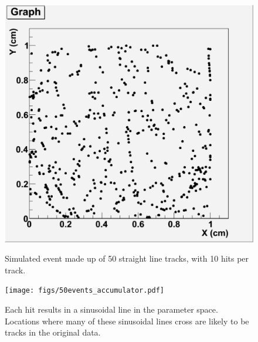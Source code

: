 \documentclass{JINST}
\begin{document}
\begin{figure}[!Hhtb]
\begin{minipage}[t]{4.9cm}
\begin{center}
	\includegraphics[width=1.\textwidth]{figs/50events_hits.pdf}
	\caption{Simulated event made up of 50 straight line tracks, with 10 hits per track. \label{fig:hits}}
	\end{center}
\end{minipage}
\begin{minipage}[t]{4.9cm}
\begin{center}
	\texttt{[image: figs/50events\_accumulator.pdf]}
	\caption{Each hit results in a sinusoidal line in the parameter space.  Locations where many 
of these sinusoidal lines cross are likely to be tracks in the original data.  \label{fig:accumulator}}
	\end{center}
\end{minipage}
\begin{minipage}[t]{4.9cm}
\begin{center}

\end{center}
\end{minipage}
\end{figure}
\end{document}
